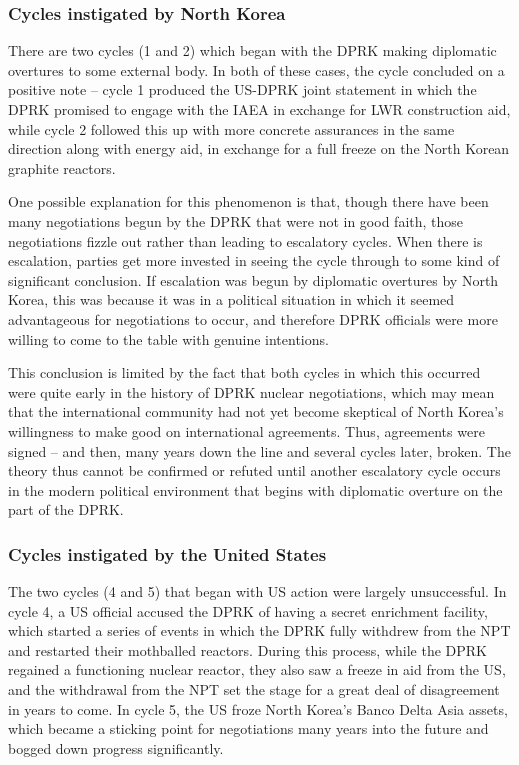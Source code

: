\documentclass{article}
\begin{document}
\subsubsection{Cycles instigated by North Korea}
There are two cycles (1 and 2) which began with the DPRK making diplomatic overtures to some external body. In both of these cases, the cycle concluded on a positive note – cycle 1 produced the US-DPRK joint statement in which the DPRK promised to engage with the IAEA in exchange for LWR construction aid, while cycle 2 followed this up with more concrete assurances in the same direction along with energy aid, in exchange for a full freeze on the North Korean graphite reactors.

One possible explanation for this phenomenon is that, though there have been many negotiations begun by the DPRK that were not in good faith, those negotiations fizzle out rather than leading to escalatory cycles. When there is escalation, parties get more invested in seeing the cycle through to some kind of significant conclusion. If escalation was begun by diplomatic overtures by North Korea, this was because it was in a political situation in which it seemed advantageous for negotiations to occur, and therefore DPRK officials were more willing to come to the table with genuine intentions.

This conclusion is limited by the fact that both cycles in which this occurred were quite early in the history of DPRK nuclear negotiations, which may mean that the international community had not yet become skeptical of North Korea’s willingness to make good on international agreements. Thus, agreements were signed – and then, many years down the line and several cycles later, broken. The theory thus cannot be confirmed or refuted until another escalatory cycle occurs in the modern political environment that begins with diplomatic overture on the part of the DPRK.

\subsubsection{Cycles instigated by the United States}
The two cycles (4 and 5) that began with US action were largely unsuccessful. In cycle 4, a US official accused the DPRK of having a secret enrichment facility, which started a series of events in which the DPRK fully withdrew from the NPT and restarted their mothballed reactors. During this process, while the DPRK regained a functioning nuclear reactor, they also saw a freeze in aid from the US, and the withdrawal from the NPT set the stage for a great deal of disagreement in years to come. In cycle 5, the US froze North Korea’s Banco Delta Asia assets, which became a sticking point for negotiations many years into the future and bogged down progress significantly.
\end{document}
